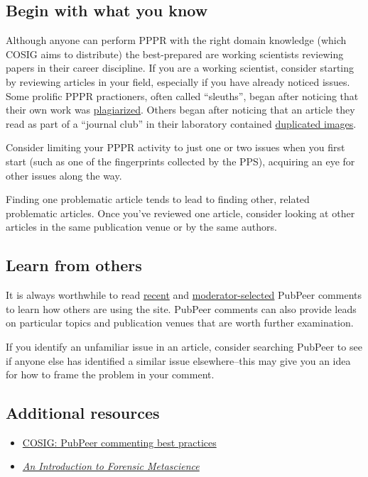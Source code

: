 \documentclass[letterpaper, 12pt]{article}
\begin{document}
\subsection*{Begin with what you know}

Although anyone can perform PPPR with the right domain knowledge (which COSIG aims to distribute) the best-prepared are working scientists reviewing papers in their career discipline. If you are a working scientist, consider starting by reviewing articles in your field, especially if you have already noticed issues. Some prolific PPPR practioners, often called ``sleuths'', began after noticing that their own work was \href{https://osf.io/ntcb4}{plagiarized}. Others began after noticing that an article they read as part of a ``journal club'' in their laboratory contained \href{https://osf.io/547re}{duplicated images}.

Consider limiting your PPPR activity to just one or two issues when you first start (such as one of the fingerprints collected by the PPS), acquiring an eye for other issues along the way.

Finding one problematic article tends to lead to finding other, related problematic articles. Once you've reviewed one article, consider looking at other articles in the same publication venue or by the same authors.

\subsection*{Learn from others}

It is always worthwhile to read \href{https://pubpeer.com/recent/}{recent} and \href{https://pubpeer.com/}{moderator-selected} PubPeer comments to learn how others are using the site. PubPeer comments can also provide leads on particular topics and publication venues that are worth further examination.

If you identify an unfamiliar issue in an article, consider searching PubPeer to see if anyone else has identified a similar issue elsewhere--this may give you an idea for how to frame the problem in your comment.

\subsection*{Additional resources}

\begin{itemize}
    \setlength\itemsep{-0.5em}
    \item \href{https://osf.io/sghaq}{COSIG: PubPeer commenting best practices}
    \item \href{https://doi.org/10.5281/zenodo.14871842}{\textit{An Introduction to Forensic Metascience}}
\end{itemize}
\end{document}
